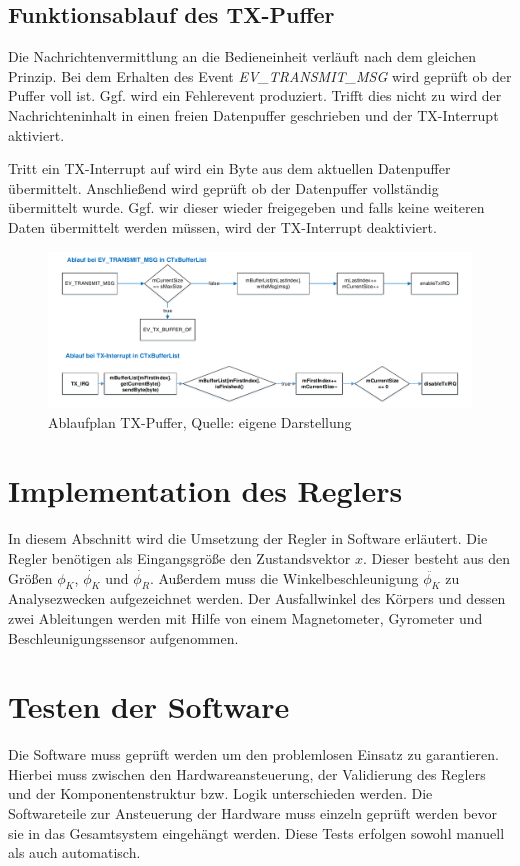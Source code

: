 \documentclass{article}
\begin{document}
\subsection*{Funktionsablauf des TX-Puffer}
Die Nachrichtenvermittlung an die Bedieneinheit verläuft nach dem gleichen Prinzip. Bei dem Erhalten des Event \textit{EV\_TRANSMIT\_MSG} wird geprüft ob der Puffer voll ist. Ggf. wird ein Fehlerevent produziert. Trifft dies nicht zu wird der Nachrichteninhalt in einen freien Datenpuffer geschrieben und der TX-Interrupt aktiviert.

Tritt ein TX-Interrupt auf wird ein Byte aus dem aktuellen Datenpuffer übermittelt. Anschließend wird geprüft ob der Datenpuffer vollständig übermittelt wurde. Ggf. wir dieser wieder freigegeben und falls keine weiteren Daten übermittelt werden müssen, wird der TX-Interrupt deaktiviert.

\begin{figure}[h]
	\includegraphics[width=\linewidth]{PAP_TxPuffer}
	\caption{Ablaufplan TX-Puffer, Quelle: eigene Darstellung}
\end{figure}

\newpage
\section{Implementation des Reglers}
In diesem Abschnitt wird die Umsetzung der Regler in Software erläutert. Die Regler benötigen als Eingangsgröße den Zustandsvektor $x$. Dieser besteht aus den Größen $\phi_K$, $\dot{\phi_K}$ und $\dot{\phi_R}$. Außerdem muss die Winkelbeschleunigung $\ddot{\phi_K}$ zu Analysezwecken aufgezeichnet werden. Der Ausfallwinkel des Körpers und dessen zwei Ableitungen werden mit Hilfe von einem Magnetometer, Gyrometer und Beschleunigungssensor aufgenommen. 

\newpage
\section{Testen der Software}
Die Software muss geprüft werden um den problemlosen Einsatz zu garantieren. Hierbei muss zwischen den Hardwareansteuerung, der Validierung des Reglers und der Komponentenstruktur bzw. Logik unterschieden werden.
Die Softwareteile zur Ansteuerung der Hardware muss einzeln geprüft werden bevor sie in das Gesamtsystem eingehängt werden. Diese Tests erfolgen sowohl manuell als auch automatisch.
\end{document}
